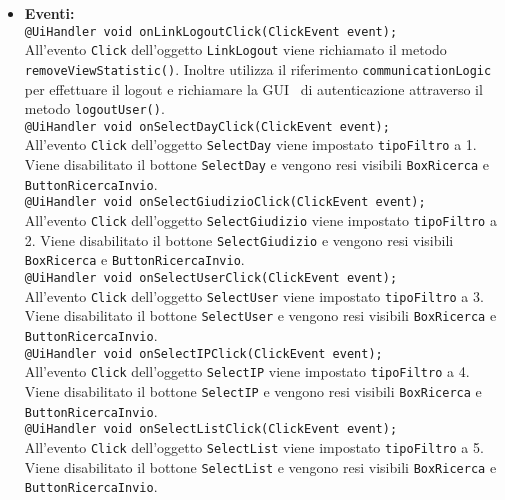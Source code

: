{\begin{sloppypar}
{{{\begin{itemize}
					\texttt{- void contactList();}\\
					Metodo che crea l'oggetto \texttt{cellList} che contiene la lista delle celle contenenti le informazioni dei contatti.
				
				\item[] \textbf{Eventi:}\\
					\texttt{@UiHandler void onLinkLogoutClick(ClickEvent event);}\\
					All'evento \texttt{Click} dell'oggetto \texttt{LinkLogout} viene richiamato il metodo \texttt{removeViewStatistic()}. Inoltre utilizza il riferimento \texttt{communicationLogic} per effettuare il logout e richiamare la GUI\g~ di autenticazione attraverso il metodo \texttt{logoutUser()}.\\
					
					\texttt{@UiHandler void onSelectDayClick(ClickEvent event);}\\
					All'evento \texttt{Click} dell'oggetto \texttt{SelectDay} viene impostato \texttt{tipoFiltro} a 1. Viene disabilitato il bottone \texttt{SelectDay} e vengono resi visibili \texttt{BoxRicerca} e \texttt{ButtonRicercaInvio}.\\
					
					\texttt{@UiHandler void onSelectGiudizioClick(ClickEvent event);}\\
					All'evento \texttt{Click} dell'oggetto \texttt{SelectGiudizio} viene impostato \texttt{tipoFiltro} a 2. Viene disabilitato il bottone \texttt{SelectGiudizio} e vengono resi visibili \texttt{BoxRicerca} e \texttt{ButtonRicercaInvio}.\\
					
					\texttt{@UiHandler void onSelectUserClick(ClickEvent event);}\\
					All'evento \texttt{Click} dell'oggetto \texttt{SelectUser} viene impostato \texttt{tipoFiltro} a 3. Viene disabilitato il bottone \texttt{SelectUser} e vengono resi visibili \texttt{BoxRicerca} e \texttt{ButtonRicercaInvio}.\\
					
					\texttt{@UiHandler void onSelectIPClick(ClickEvent event);}\\
					All'evento \texttt{Click} dell'oggetto \texttt{SelectIP} viene impostato \texttt{tipoFiltro} a 4. Viene disabilitato il bottone \texttt{SelectIP} e vengono resi visibili \texttt{BoxRicerca} e \texttt{ButtonRicercaInvio}.\\
					
					\texttt{@UiHandler void onSelectListClick(ClickEvent event);}\\
					All'evento \texttt{Click} dell'oggetto \texttt{SelectList} viene impostato \texttt{tipoFiltro} a 5. Viene disabilitato il bottone \texttt{SelectList} e vengono resi visibili \texttt{BoxRicerca} e \texttt{ButtonRicercaInvio}.\\
					

\end{itemize}}}}
\end{sloppypar}}
